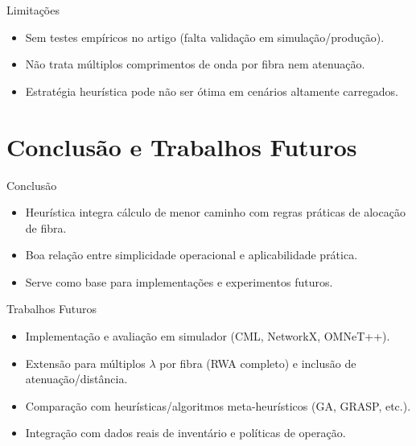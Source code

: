 \documentclass[aspectratio=169,xcolor=dvipsnames]{beamer}
\begin{document}
\begin{frame}{Limitações}
  \begin{itemize}
    \item Sem testes empíricos no artigo (falta validação em simulação/produção).
    \item Não trata múltiplos comprimentos de onda por fibra nem atenuação.
    \item Estratégia heurística pode não ser ótima em cenários altamente carregados.
  \end{itemize}
\end{frame}

\section{Conclusão e Trabalhos Futuros}
\begin{frame}{Conclusão}
  \begin{itemize}
    \item Heurística integra cálculo de menor caminho com regras práticas de alocação de fibra.
    \item Boa relação entre simplicidade operacional e aplicabilidade prática.
    \item Serve como base para implementações e experimentos futuros.
  \end{itemize}
\end{frame}

\begin{frame}{Trabalhos Futuros}
  \begin{itemize}
    \item Implementação e avaliação em simulador (CML, NetworkX, OMNeT++).
    \item Extensão para múltiplos $\lambda$ por fibra (RWA completo) e inclusão de atenuação/distância.
    \item Comparação com heurísticas/algoritmos meta-heurísticos (GA, GRASP, etc.).
    \item Integração com dados reais de inventário e políticas de operação.
  \end{itemize}
\end{frame}
\end{document}
